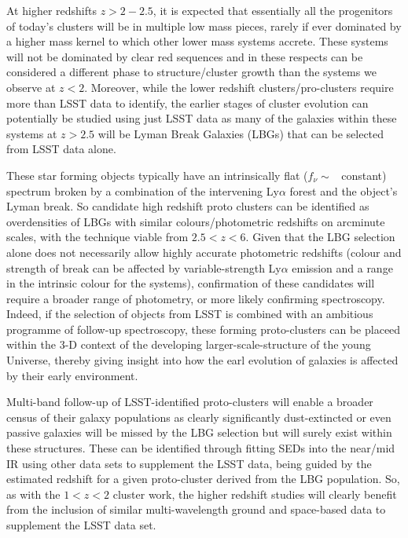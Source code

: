 \documentclass[a4paper,11pt]{article}
\begin{document}
At higher redshifts $z>2-2.5$, it is expected that essentially all the
progenitors of today's clusters will be in multiple low mass pieces,
rarely if ever dominated by a higher mass kernel to which other lower
mass systems accrete.  These systems will not be dominated by clear
red sequences and in these respects can be considered a different
phase to structure/cluster growth than the systems we observe at
$z<2$.  Moreover, while the lower redshift clusters/pro-clusters
require more than LSST data to identify, the earlier stages of cluster
evolution can potentially be studied using just LSST data as many of
the galaxies within these systems at $z>2.5$ will be Lyman Break
Galaxies (LBGs) that can be selected from LSST data alone.

These star forming objects typically have an intrinsically flat
($f_\nu \sim $~ constant) spectrum broken by a combination of the
intervening Ly$\alpha$ forest and the object's Lyman break.  So
candidate high redshift proto clusters can be identified as
overdensities of LBGs with similar colours/photometric redshifts on
arcminute scales, with the technique viable from $2.5<z<6$. Given that
the LBG selection alone does not necessarily allow highly accurate
photometric redshifts (colour and strength of break can be affected by
variable-strength Ly$\alpha$ emission and a range in the intrinsic
colour for the systems), confirmation of these candidates will require
a broader range of photometry, or more likely confirming spectroscopy.
Indeed, if the selection of objects from LSST is combined with an
ambitious programme of follow-up spectroscopy, these forming
proto-clusters can be placeed within the 3-D context of the developing
larger-scale-structure of the young Universe, thereby giving insight
into how the earl evolution of galaxies is affected by their early
environment.

Multi-band follow-up of LSST-identified proto-clusters will enable a
broader census of their galaxy populations as clearly significantly
dust-extincted or even passive galaxies will be missed by the LBG
selection but will surely exist within these structures.  These can be
identified through fitting SEDs into the near/mid IR using other data
sets to supplement the LSST data, being guided by the estimated
redshift for a given proto-cluster derived from the LBG
population. So, as with the $1<z<2$ cluster work, the higher redshift
studies will clearly benefit from the inclusion of similar
multi-wavelength ground and space-based data to supplement the LSST
data set.
\end{document}
